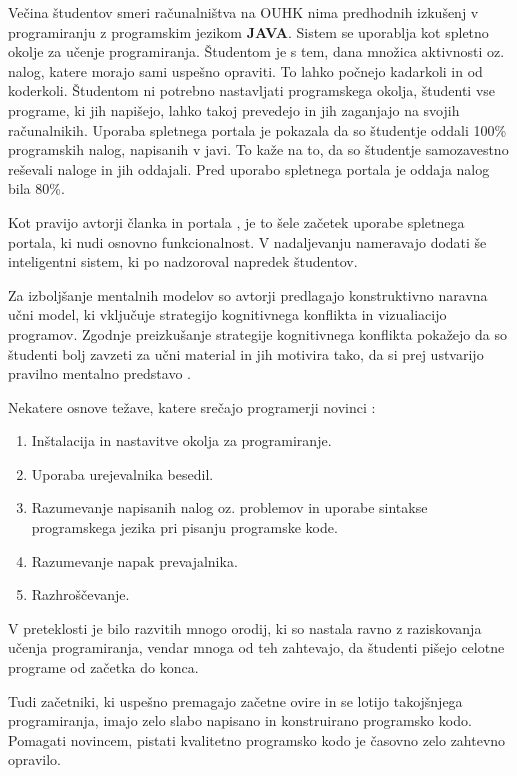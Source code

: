Večina študentov smeri računalništva na OUHK nima predhodnih izkušenj
v programiranju z programskim jezikom \textbf{JAVA}. Sistem se
uporablja kot spletno okolje za učenje programiranja. Študentom je s
tem, dana množica aktivnosti oz. nalog, katere morajo sami uspešno
opraviti. To lahko počnejo kadarkoli in od koderkoli. Študentom ni
potrebno nastavljati programskega okolja, študenti vse programe, ki
jih napišejo, lahko takoj prevedejo in jih zaganjajo na svojih
računalnikih. Uporaba spletnega portala je pokazala da so študentje
oddali 100\% programskih nalog, napisanih v javi. To kaže na to, da so
študentje samozavestno reševali naloge in jih oddajali. Pred uporabo
spletnega portala je oddaja nalog bila 80\%.

Kot pravijo avtorji članka in portala \cite{ITaLCP_DistanceEdu}, je to
šele začetek uporabe spletnega portala, ki nudi osnovno
funkcionalnost. V nadaljevanju nameravajo dodati še inteligentni
sistem, ki po nadzoroval napredek študentov.

Za izboljšanje mentalnih modelov so avtorji predlagajo konstruktivno
naravna učni model, ki vključuje strategijo kognitivnega konflikta in
vizualiacijo programov. Zgodnje preizkušanje strategije kognitivnega
konflikta pokažejo da so študenti bolj zavzeti za učni material in jih
motivira tako, da si prej ustvarijo pravilno mentalno predstavo
\cite{mentalModels}.



Nekatere osnove težave, katere srečajo programerji novinci \cite{thesisAWebP}:
\begin{enumerate}
\tightlist
\item
  Inštalacija in nastavitve okolja za programiranje.
\item
  Uporaba urejevalnika besedil.
\item Razumevanje napisanih nalog oz. problemov in uporabe sintakse
  programskega jezika pri pisanju programske kode.
\item
  Razumevanje napak prevajalnika.
\item
  Razhroščevanje.
\end{enumerate}

V preteklosti je bilo razvitih mnogo orodij, ki so nastala ravno z
raziskovanja učenja programiranja, vendar mnoga od teh zahtevajo, da
študenti pišejo celotne programe od začetka do konca.

Tudi začetniki, ki uspešno premagajo začetne ovire in se lotijo
takojšnjega programiranja, imajo zelo slabo napisano in konstruirano
programsko kodo. Pomagati novincem, pistati kvalitetno programsko kodo
je časovno zelo zahtevno opravilo.

